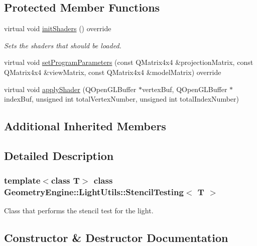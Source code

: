\subsection*{Protected Member Functions}
\begin{DoxyCompactItemize}
\item 
\mbox{\label{class_geometry_engine_1_1_light_utils_1_1_stencil_testing_a39c9936685a7eb4354ef84bb45b77210}} 
virtual void \mbox{\hyperlink{class_geometry_engine_1_1_light_utils_1_1_stencil_testing_a39c9936685a7eb4354ef84bb45b77210}{init\+Shaders}} () override
\begin{DoxyCompactList}\small\item\em Sets the shaders that should be loaded. \end{DoxyCompactList}\item 
virtual void \mbox{\hyperlink{class_geometry_engine_1_1_light_utils_1_1_stencil_testing_a21337fa050ef990710dff816934bae96}{set\+Program\+Parameters}} (const Q\+Matrix4x4 \&projection\+Matrix, const Q\+Matrix4x4 \&view\+Matrix, const Q\+Matrix4x4 \&model\+Matrix) override
\item 
virtual void \mbox{\hyperlink{class_geometry_engine_1_1_light_utils_1_1_stencil_testing_a61aed251a91416f2e0ccf01be29c103f}{apply\+Shader}} (Q\+Open\+G\+L\+Buffer $\ast$vertex\+Buf, Q\+Open\+G\+L\+Buffer $\ast$index\+Buf, unsigned int total\+Vertex\+Number, unsigned int total\+Index\+Number)
\end{DoxyCompactItemize}
\subsection*{Additional Inherited Members}


\subsection{Detailed Description}
\subsubsection*{template$<$class T$>$\newline
class Geometry\+Engine\+::\+Light\+Utils\+::\+Stencil\+Testing$<$ T $>$}

Class that performs the stencil test for the light. 

\subsection{Constructor \& Destructor Documentation}
\mbox{\label{class_geometry_engine_1_1_light_utils_1_1_stencil_testing_a30ec1f9d091279284ebb056bc019403c}} 
